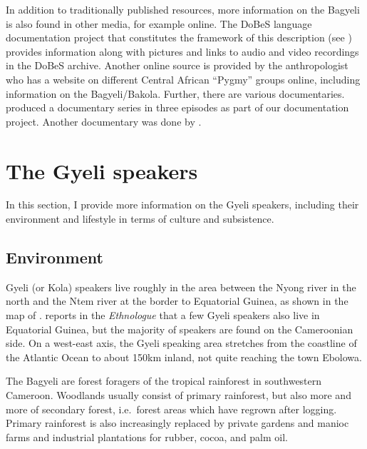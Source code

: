 In addition to traditionally published resources, more information on the Bagyeli is also found in other media, for example online. The DoBeS language documentation project that constitutes the framework of this description (see ) provides information along with pictures and links to audio and video recordings in the DoBeS archive.  Another online source is provided by the anthropologist \citet{devin2015} who has a website on different Central African ``Pygmy'' groups online, including information on the Bagyeli/Bakola. Further, there are various documentaries. \citet{lorenz2014} produced a documentary series in three episodes as part of our documentation project. Another documentary was done by \citet{thomopoulos2012}. %





\section{The Gyeli speakers}
\label{sec:GyeliSp}

In this section, I provide more information on the Gyeli speakers, including their environment and lifestyle in terms of culture and subsistence.

\subsection{Environment}
\label{sec:Environ}

Gyeli (or Kola) speakers live roughly in the area between the Nyong river in the north and the Ntem river at the border to Equatorial Guinea, as shown in the map of . \citet{lewis09} reports in the {\itshape Ethnologue} that a few Gyeli speakers also live in Equatorial Guinea, but the majority of speakers are found on the  Cameroonian side.
On a west-east axis, the Gyeli speaking area stretches from the coastline of the Atlantic Ocean to about 150km inland, not quite reaching the town Ebolowa. 

The Bagyeli are forest foragers of the tropical rainforest in southwestern Cameroon. Woodlands usually consist of primary rainforest, but also more and more of secondary forest, i.e.\ forest areas which have regrown after logging.
Primary rainforest is also increasingly replaced by private gardens and manioc farms and industrial plantations for rubber, cocoa, and palm oil.

